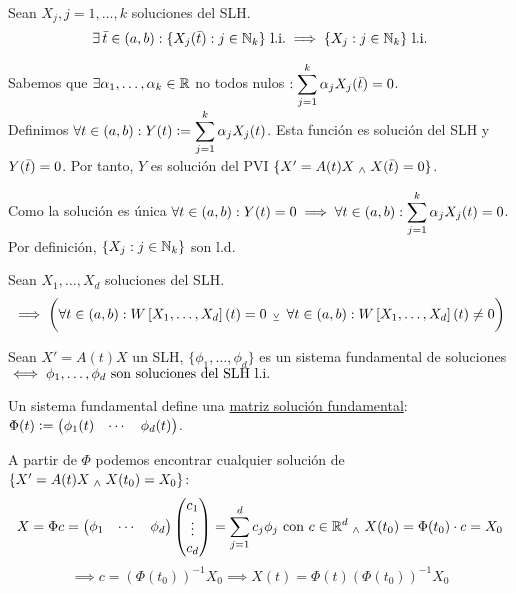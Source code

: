 \begin{lem}
	Sean $X_j, j = 1, \dots, k$ soluciones del SLH.
	\[\exists \, \Bar{t} \in (a, b) : \{X_j(\Bar{t}) : j \in \mathbb{N}_k\} \text{ l.i.} \implies \{X_j : j \in \mathbb{N}_k\} \text{ l.i.}\]
	\begin{dem}
		Sabemos que $\exists \alpha_1, \dots, \alpha_k \in \mathbb{R}$ no todos nulos $ : \displaystyle \sum_{j=1}^{k} \alpha_j X_j(\Bar{t}) =0$. \\
		Definimos $\displaystyle \forall t \in (a,b) : Y(t) \vcentcolon= \sum_{j=1}^{k} \alpha_j X_j(t)$. Esta función es solución del SLH y $Y(\Bar{t}) = 0$. Por tanto, $Y$ es solución del PVI $\{X' = A(t)X \; _{\wedge} \; X(\Bar{t}) = 0\}$.

		Como la solución es única $\displaystyle \forall t\in (a, b) : Y(t) = 0 \implies \forall t\in (a, b) : \sum_{j=1}^{k} \alpha_j X_j(t) = 0$.\\
		Por definición, $\{X_j : j \in \mathbb{N}_k\}$ son l.d.
	\end{dem}
\end{lem}

\begin{prop}
	Sean $X_1, \dots, X_d$ soluciones del SLH.
	\[\implies \bigg(\forall t \in (a, b) : W\left[X_1, \dots, X_d\right](t) = 0\, \; _{\veebar} \; \, \forall t \in (a, b) : W\left[X_1, \dots, X_d\right](t) \neq 0\bigg)\]
\end{prop}


\begin{defn}
	Sean $X'=A(t)X$ un SLH, $\{\phi_1, \dots, \phi_d\}$ es un sistema fundamental de soluciones $\iff \phi_1, \dots, \phi_d\text{ son soluciones del SLH l.i.}$
\end{defn}

Un sistema fundamental define una \underline{matriz solución fundamental}: $\displaystyle \Phi(t) \vcentcolon= \begin{pmatrix}
		\phi_1(t) & \cdots & \phi_d(t)
	\end{pmatrix}$.

A partir de $\Phi$ podemos encontrar cualquier solución de $\{X'=A(t)X \; _{\wedge} \; X(t_0) = X_0\}$:
\[X=\Phi c = \begin{pmatrix}
		\phi_1 & \cdots & \phi_d
	\end{pmatrix} \begin{pmatrix}
		c_1    \\
		\vdots \\
		c_d
	\end{pmatrix} = \sum_{j=1}^{d} c_j \phi_j \text{ con }c \in \mathbb{R}^d \; _{\wedge} \; X(t_0) = \Phi(t_0) \cdot c=X_0 \]
\[\implies c = \left(\Phi(t_0)\right)^{-1} X_0 \implies \boxed{X(t) = \Phi(t) \left(\Phi(t_0)\right)^{-1} X_0}\]

